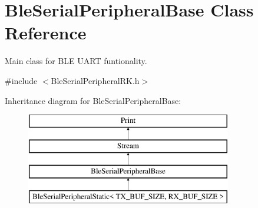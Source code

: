 \hypertarget{class_ble_serial_peripheral_base}{}\section{Ble\+Serial\+Peripheral\+Base Class Reference}
\label{class_ble_serial_peripheral_base}


Main class for B\+LE U\+A\+RT funtionality.  




{\ttfamily \#include $<$Ble\+Serial\+Peripheral\+R\+K.\+h$>$}

Inheritance diagram for Ble\+Serial\+Peripheral\+Base\+:\begin{figure}[H]
\begin{center}
\leavevmode
\includegraphics[height=4.000000cm]{class_ble_serial_peripheral_base}
\end{center}
\end{figure}
